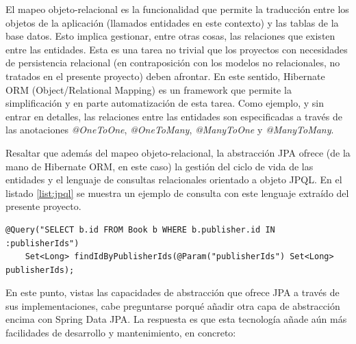 \documentclass[a4paper]{article}
\begin{document}
    El mapeo objeto-relacional es la funcionalidad que permite la traducción entre los objetos de la aplicación (llamados entidades en este contexto) y las tablas de la base datos. Esto implica gestionar, entre otras cosas, las relaciones que existen entre las entidades. Esta es una tarea no trivial que los proyectos con necesidades de persistencia relacional (en contraposición con los modelos no relacionales, no tratados en el presente proyecto) deben afrontar. En este sentido, Hibernate ORM (Object/Relational Mapping) es un framework que permite la simplificación y en parte automatización de esta tarea. Como ejemplo, y sin entrar en detalles, las relaciones entre las entidades son especificadas a través de las anotaciones \emph{@OneToOne}, \emph{@OneToMany}, \emph{@ManyToOne} y \emph{@ManyToMany}.
    
    Resaltar que además del mapeo objeto-relacional, la abstracción JPA ofrece (de la mano de Hibernate ORM, en este caso) la gestión del ciclo de vida de las entidades y el lenguaje de consultas relacionales orientado a objeto JPQL. En el listado \ref{list:jpql} se muestra un ejemplo de consulta con este lenguaje extraído del presente proyecto.
    
    \begin{lstlisting}[caption=Ejemplo de consulta especificada en JPQL,label=list:jpql]
    @Query("SELECT b.id FROM Book b WHERE b.publisher.id IN :publisherIds")
    Set<Long> findIdByPublisherIds(@Param("publisherIds") Set<Long> publisherIds);
    \end{lstlisting}
    
    En este punto, vistas las capacidades de abstracción que ofrece JPA a través de sus implementaciones, cabe preguntarse porqué añadir otra capa de abstracción encima con Spring Data JPA. La respuesta es que esta tecnología añade aún más facilidades de desarrollo y mantenimiento, en concreto:
    
\end{document}
